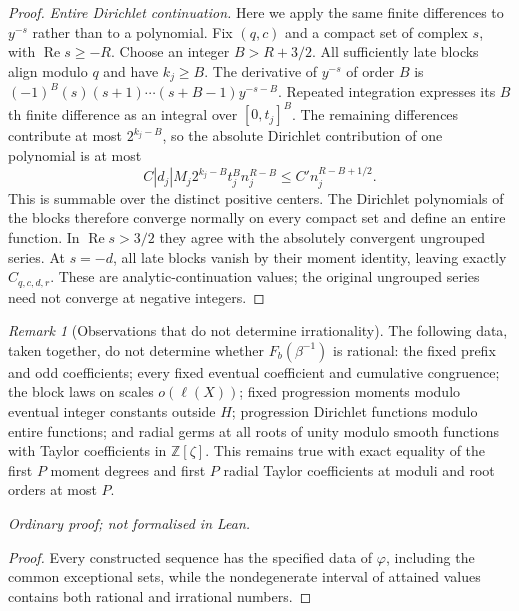 \documentclass[11pt]{article}
\theoremstyle{plain}
\theoremstyle{definition}
\theoremstyle{remark}
\newtheorem{rem}[thm]{Remark}
\newcommand{\Z}{\mathbb{Z}}
\begin{document}
\begin{proof}
\emph{Entire Dirichlet continuation.} Here we apply the same finite
differences to $y^{-s}$ rather than to a polynomial. Fix $(q,c)$ and a
compact set of complex $s$, with $\operatorname{Re}s\ge-R$. Choose an
integer $B>R+3/2$. All sufficiently late blocks align modulo $q$ and
have $k_j\ge B$. The derivative of $y^{-s}$ of order $B$ is
$(-1)^B(s)(s+1)\cdots(s+B-1)y^{-s-B}$. Repeated integration expresses
its $B$th finite difference as an integral over $[0,t_j]^B$.
The remaining differences contribute at most $2^{k_j-B}$, so the
absolute Dirichlet contribution of one polynomial is at most
\[
 C|d_j|M_j2^{k_j-B}t_j^B n_j^{R-B}
 \le C' n_j^{R-B+1/2}.
\]
This is summable over the distinct positive centers. The Dirichlet polynomials of the blocks therefore converge normally on every compact
set and define an entire function. In $\operatorname{Re}s>3/2$ they
agree with the absolutely convergent ungrouped series. At $s=-d$,
all late blocks vanish by their moment identity, leaving exactly
$C_{q,c,d,r}$. These are analytic-continuation values; the original
ungrouped series need not converge at negative integers.
\end{proof}

\begin{rem}[Observations that do not determine irrationality]
\label{long249:cor:signed-observations}
The following data, taken together, do not determine whether
$F_b(\beta^{-1})$ is rational: the fixed prefix and odd coefficients;
every fixed eventual coefficient and cumulative congruence; the block
laws on scales $o(\ell(X))$; fixed progression moments modulo eventual
integer constants outside $H$; progression Dirichlet functions modulo
entire functions; and radial germs at all roots of unity modulo smooth
functions with Taylor coefficients in $\Z[\zeta]$. This remains true
with exact equality of the first $P$ moment degrees and first $P$
radial Taylor coefficients at moduli and root orders at most $P$.
\end{rem}
\noindent\emph{Ordinary proof; not formalised in Lean.}


\begin{proof}
Every constructed sequence has the specified data of $\varphi$, including
the common exceptional sets, while the nondegenerate interval of attained
values contains both rational and irrational numbers.
\end{proof}
\end{document}
